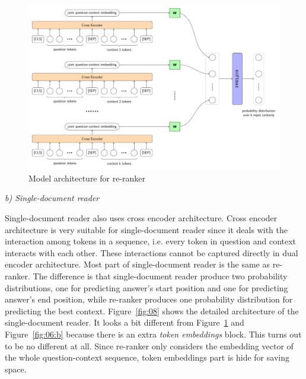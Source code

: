 \documentclass[3p, sort&compress, 12pt]{elsarticle}
\begin{document}
\begin{figure}[!htbp]
	\centering
	\includegraphics[scale=.6]{images/PDF/full-reranker/fullRerank.pdf}	
	\caption{Model architecture for re-ranker}
	\label{fig:07}
\end{figure}
\par \textit{b) Single-document reader}
\par Single-document reader also uses cross encoder architecture. Cross encoder architecture is very suitable for single-document reader since it deals with the interaction among tokens in a sequence, i.e. every token in question and context interacts with each other. These interactions cannot be captured directly in dual encoder architecture. Most part of single-document reader is the same as re-ranker. The difference is that single-document reader produce two probability distributions, one for predicting answer's start position and one for predicting answer's end position, while re-ranker produces one probability distribution for predicting the best context. Figure~\ref{fig:08} shows the detailed architecture of the single-document reader. It looks a bit different from Figure~\ref{fig:07} and Figure~\ref{fig:06:b} because there is an extra \textit{token embeddings} block. This turns out to be no different at all. Since re-ranker only considers the embedding vector of the whole question-context sequence, token embeddings part is hide for saving space.
\end{document}
